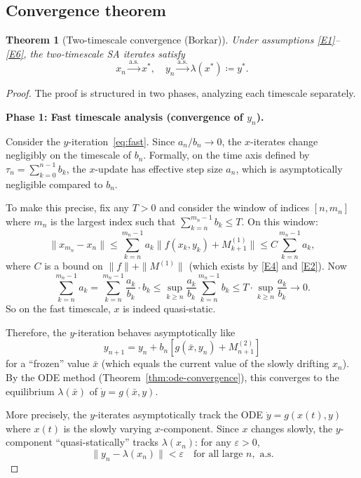 \documentclass[11pt,a4paper]{article}
\theoremstyle{definition}
\theoremstyle{plain}
\newtheorem{theorem}{Theorem}[section]
\theoremstyle{remark}
\newcommand{\cas}{\xrightarrow{\text{a.s.}}}
\begin{document}
\subsection{Convergence theorem}

\begin{theorem}[Two-timescale convergence (Borkar)]
\label{thm:two-timescale}
Under assumptions \ref{E1}--\ref{E6}, the two-timescale SA iterates satisfy
\[
  x_n \cas x^*, \quad y_n \cas \lambda(x^*) \coloneqq y^*.
\]
\end{theorem}

\begin{proof}
The proof is structured in two phases, analyzing each timescale separately.

\medskip
\noindent\textbf{Phase 1: Fast timescale analysis (convergence of $y_n$).}

Consider the $y$-iteration~\eqref{eq:fast}. Since $a_n / b_n \to 0$, the
$x$-iterates change negligibly on the timescale of $b_n$. Formally, on the time
axis defined by $\tau_n = \sum_{k=0}^{n-1} b_k$, the $x$-update has effective
step size $a_n$, which is asymptotically negligible compared to $b_n$.

To make this precise, fix any $T > 0$ and consider the window of indices $[n, m_n]$
where $m_n$ is the largest index such that $\sum_{k=n}^{m_n - 1} b_k \leq T$. On
this window:
\[
  \|x_{m_n} - x_n\| \leq \sum_{k=n}^{m_n-1} a_k \|f(x_k, y_k) + M_{k+1}^{(1)}\|
    \leq C \sum_{k=n}^{m_n-1} a_k,
\]
where $C$ is a bound on $\|f\| + \|M^{(1)}\|$ (which exists by \ref{E4} and
\ref{E2}). Now
\[
  \sum_{k=n}^{m_n-1} a_k = \sum_{k=n}^{m_n-1} \frac{a_k}{b_k} \cdot b_k
    \leq \sup_{k \geq n} \frac{a_k}{b_k} \sum_{k=n}^{m_n-1} b_k
    \leq T \cdot \sup_{k \geq n} \frac{a_k}{b_k} \to 0.
\]
So on the fast timescale, $x$ is indeed quasi-static.

Therefore, the $y$-iteration behaves asymptotically like
\[
  y_{n+1} = y_n + b_n [g(\bar{x}, y_n) + M_{n+1}^{(2)}]
\]
for a ``frozen'' value $\bar{x}$ (which equals the current value of the slowly
drifting $x_n$). By the ODE method (Theorem~\ref{thm:ode-convergence}), this
converges to the equilibrium $\lambda(\bar{x})$ of $\dot{y} = g(\bar{x}, y)$.

More precisely, the $y$-iterates asymptotically track the ODE
$\dot{y} = g(x(t), y)$ where $x(t)$ is the slowly varying $x$-component. Since
$x$ changes slowly, the $y$-component ``quasi-statically'' tracks $\lambda(x_n)$:
for any $\varepsilon > 0$,
\begin{equation}
\label{eq:y-tracking}
  \|y_n - \lambda(x_n)\| < \varepsilon \quad \text{for all large } n, \text{ a.s.}
\end{equation}


\end{proof}
\end{document}
